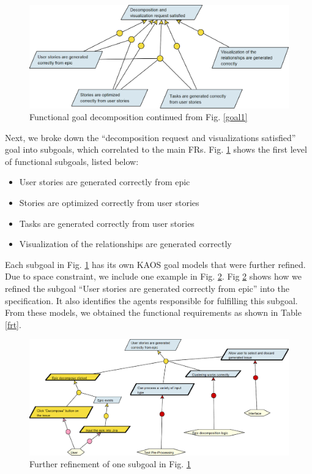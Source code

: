 \begin{figure}
\centering
\includegraphics[width=\textwidth,keepaspectratio]{./figure/GoalsNFR2.png}
\caption{Functional goal decomposition continued from Fig. \ref{goal1}}
\label{frgs}
\end{figure}

Next, we broke down the “decomposition request and visualizations satisfied” goal into subgoals, which correlated to the main FRs. Fig. \ref{frgs} shows the first level of functional subgoals, listed below: 

\begin{itemize}
	\item User stories are generated correctly from epic
	\item Stories are optimized correctly from user stories
	\item Tasks are generated correctly from user stories
	\item Visualization of the relationships are generated correctly
\end{itemize}

Each subgoal in Fig. \ref{frgs} has its own KAOS goal models that were further refined. Due to space constraint, we include one example in Fig. \ref{fr1}. Fig \ref{fr1} shows how we refined the subgoal ``User stories are generated correctly from epic'' into the specification. It also identifies the agents responsible for fulfilling this subgoal.  From these models, we obtained the functional requirements as shown in Table \ref{frt}.

\begin{figure}
\centering
\includegraphics[width=\textwidth]{./figure/GoalsFR1.png}
\caption{Further refinement of one subgoal in Fig. \ref{frgs}}
\label{fr1}
\end{figure}

